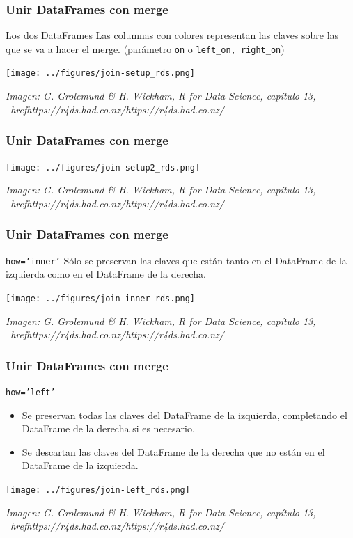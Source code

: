 \documentclass[9pt]{beamer}
\begin{document}
\begin{frame}
  \frametitle{Unir DataFrames con merge}
  \begin{block}{Los dos DataFrames}
    Las columnas con colores representan las claves sobre las que se va a hacer el merge. (parámetro {\tt on} o {\tt left\_on, right\_on})
  \end{block}
         \begin{center}
           \texttt{[image: ../figures/join-setup\_rds.png]}\smallskip
           
           \textit{\footnotesize Imagen: G. Grolemund \& H. Wickham, R for Data Science, capítulo 13, \ href{https://r4ds.had.co.nz/}{https://r4ds.had.co.nz/}}
      \end{center}
\end{frame}
\begin{frame}
  \frametitle{Unir DataFrames con merge}
         \begin{center}
           \texttt{[image: ../figures/join-setup2\_rds.png]}\smallskip
           
           \textit{\footnotesize Imagen: G. Grolemund \& H. Wickham, R for Data Science, capítulo 13, \ href{https://r4ds.had.co.nz/}{https://r4ds.had.co.nz/}}
      \end{center}
\end{frame}
\begin{frame}
  \frametitle{Unir DataFrames con merge}
  \begin{block}{\tt how='inner'}
    Sólo se preservan las claves que están tanto en el DataFrame de la izquierda como en el DataFrame de la derecha.
  \end{block}
         \begin{center}
           \texttt{[image: ../figures/join-inner\_rds.png]}\smallskip
           
           \textit{\footnotesize Imagen: G. Grolemund \& H. Wickham, R for Data Science, capítulo 13, \ href{https://r4ds.had.co.nz/}{https://r4ds.had.co.nz/}}
      \end{center}
\end{frame}
\begin{frame}
  \frametitle{Unir DataFrames con merge}
  \begin{block}{\tt how='left'}
    \begin{itemize}
    \item Se preservan todas las claves del DataFrame de la izquierda, completando el DataFrame de la derecha si es necesario. 
    \item Se descartan las claves del DataFrame de la derecha que no están en el DataFrame de la izquierda.
    \end{itemize}
  \end{block}
         \begin{center}
           \texttt{[image: ../figures/join-left\_rds.png]}\smallskip
           
           \textit{\footnotesize Imagen: G. Grolemund \& H. Wickham, R for Data Science, capítulo 13, \ href{https://r4ds.had.co.nz/}{https://r4ds.had.co.nz/}}
      \end{center}
\end{frame}
\end{document}
